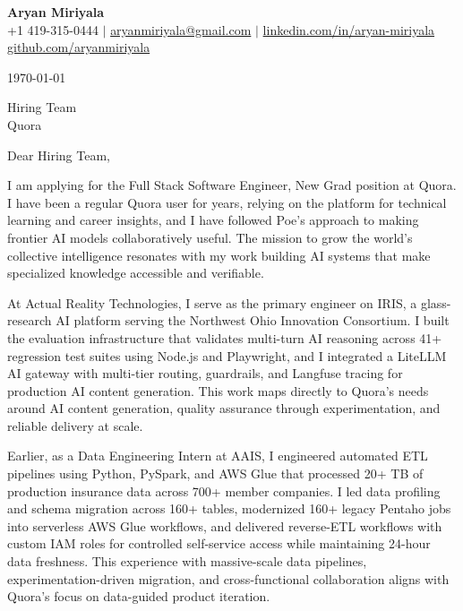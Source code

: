 \documentclass[letterpaper,11pt]{article}
\begin{document}
\begin{center}
  {\LARGE \textbf{Aryan Miriyala}}\\[2pt]
  \small
  +1 419-315-0444 $|$ \href{mailto:aryanmiriyala@gmail.com}{aryanmiriyala@gmail.com} $|$ \href{https://www.linkedin.com/in/aryan-miriyala-7788a21b6/}{linkedin.com/in/aryan-miriyala}\\
  \href{https://github.com/aryanmiriyala}{github.com/aryanmiriyala}
\end{center}\vspace{12pt}

\today

\vspace{12pt}

Hiring Team\\
Quora

\vspace{12pt}

Dear Hiring Team,

\vspace{6pt}

I am applying for the Full Stack Software Engineer, New Grad position at Quora. I have been a regular Quora user for years, relying on the platform for technical learning and career insights, and I have followed Poe's approach to making frontier AI models collaboratively useful. The mission to grow the world's collective intelligence resonates with my work building AI systems that make specialized knowledge accessible and verifiable.

\vspace{6pt}

At Actual Reality Technologies, I serve as the primary engineer on IRIS, a glass-research AI platform serving the Northwest Ohio Innovation Consortium. I built the evaluation infrastructure that validates multi-turn AI reasoning across 41+ regression test suites using Node.js and Playwright, and I integrated a LiteLLM AI gateway with multi-tier routing, guardrails, and Langfuse tracing for production AI content generation. This work maps directly to Quora's needs around AI content generation, quality assurance through experimentation, and reliable delivery at scale.

\vspace{6pt}

Earlier, as a Data Engineering Intern at AAIS, I engineered automated ETL pipelines using Python, PySpark, and AWS Glue that processed 20+ TB of production insurance data across 700+ member companies. I led data profiling and schema migration across 160+ tables, modernized 160+ legacy Pentaho jobs into serverless AWS Glue workflows, and delivered reverse-ETL workflows with custom IAM roles for controlled self-service access while maintaining 24-hour data freshness. This experience with massive-scale data pipelines, experimentation-driven migration, and cross-functional collaboration aligns with Quora's focus on data-guided product iteration.
\end{document}
